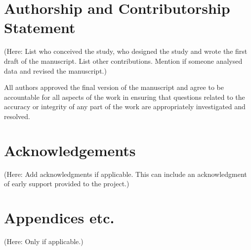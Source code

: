 \documentclass{ldr-article}
\begin{document}
\section{Authorship and Contributorship Statement}

(Here: List who conceived the study, who designed the study and wrote the first draft of the manuscript. List other contributions. Mention if someone analysed data and revised the manuscript.)

All authors approved the final version of the manuscript and agree to be accountable for all aspects of the work in ensuring that questions related to the accuracy or integrity of any part of the work are appropriately investigated and resolved.

\section{Acknowledgements}

(Here: Add acknowledgments if applicable. This can include an acknowledgment of early support provided to the project.)

\clearpage
\appendix

\section{Appendices etc.}

(Here: Only if applicable.)
\end{document}
